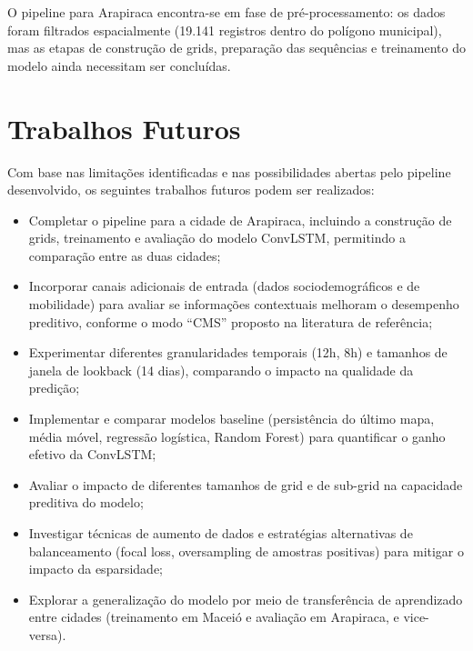 O pipeline para Arapiraca encontra-se em fase de pré-processamento: os dados foram filtrados espacialmente (19.141 registros dentro do polígono municipal), mas as etapas de construção de grids, preparação das sequências e treinamento do modelo ainda necessitam ser concluídas.


\section{Trabalhos Futuros}
\label{Sec:TrabalhosFuturos}

Com base nas limitações identificadas e nas possibilidades abertas pelo pipeline desenvolvido, os seguintes trabalhos futuros podem ser realizados:

\begin{itemize}
  \item Completar o pipeline para a cidade de Arapiraca, incluindo a construção de grids, treinamento e avaliação do modelo ConvLSTM, permitindo a comparação entre as duas cidades;
  \item Incorporar canais adicionais de entrada (dados sociodemográficos e de mobilidade) para avaliar se informações contextuais melhoram o desempenho preditivo, conforme o modo ``CMS'' proposto na literatura de referência;
  \item Experimentar diferentes granularidades temporais (12h, 8h) e tamanhos de janela de lookback (14 dias), comparando o impacto na qualidade da predição;
  \item Implementar e comparar modelos baseline (persistência do último mapa, média móvel, regressão logística, Random Forest) para quantificar o ganho efetivo da ConvLSTM;
  \item Avaliar o impacto de diferentes tamanhos de grid e de sub-grid na capacidade preditiva do modelo;
  \item Investigar técnicas de aumento de dados e estratégias alternativas de balanceamento (focal loss, oversampling de amostras positivas) para mitigar o impacto da esparsidade;
  \item Explorar a generalização do modelo por meio de transferência de aprendizado entre cidades (treinamento em Maceió e avaliação em Arapiraca, e vice-versa).
\end{itemize}

